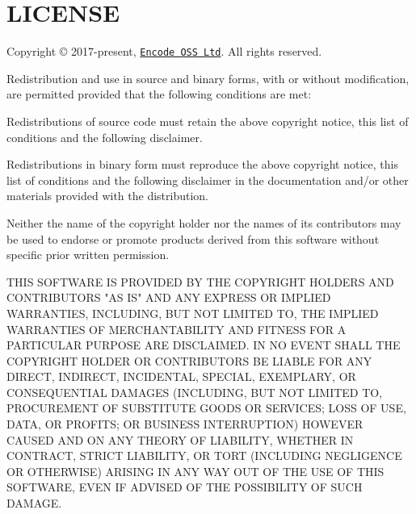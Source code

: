 \chapter{LICENSE }
\hypertarget{md_venv_2lib_2python3_812_2site-packages_2uvicorn-0_829_80_8dist-info_2licenses_2LICENSE}{}\label{md_venv_2lib_2python3_812_2site-packages_2uvicorn-0_829_80_8dist-info_2licenses_2LICENSE}
Copyright © 2017-\/present, \href{https://www.encode.io/}{\texttt{Encode OSS Ltd}}. All rights reserved.

Redistribution and use in source and binary forms, with or without modification, are permitted provided that the following conditions are met:\+


\begin{DoxyItemize}
\item Redistributions of source code must retain the above copyright notice, this list of conditions and the following disclaimer.
\item Redistributions in binary form must reproduce the above copyright notice, this list of conditions and the following disclaimer in the documentation and/\+or other materials provided with the distribution.
\item Neither the name of the copyright holder nor the names of its contributors may be used to endorse or promote products derived from this software without specific prior written permission.
\end{DoxyItemize}

THIS SOFTWARE IS PROVIDED BY THE COPYRIGHT HOLDERS AND CONTRIBUTORS "{}\+AS IS"{} AND ANY EXPRESS OR IMPLIED WARRANTIES, INCLUDING, BUT NOT LIMITED TO, THE IMPLIED WARRANTIES OF MERCHANTABILITY AND FITNESS FOR A PARTICULAR PURPOSE ARE DISCLAIMED. IN NO EVENT SHALL THE COPYRIGHT HOLDER OR CONTRIBUTORS BE LIABLE FOR ANY DIRECT, INDIRECT, INCIDENTAL, SPECIAL, EXEMPLARY, OR CONSEQUENTIAL DAMAGES (INCLUDING, BUT NOT LIMITED TO, PROCUREMENT OF SUBSTITUTE GOODS OR SERVICES; LOSS OF USE, DATA, OR PROFITS; OR BUSINESS INTERRUPTION) HOWEVER CAUSED AND ON ANY THEORY OF LIABILITY, WHETHER IN CONTRACT, STRICT LIABILITY, OR TORT (INCLUDING NEGLIGENCE OR OTHERWISE) ARISING IN ANY WAY OUT OF THE USE OF THIS SOFTWARE, EVEN IF ADVISED OF THE POSSIBILITY OF SUCH DAMAGE. 